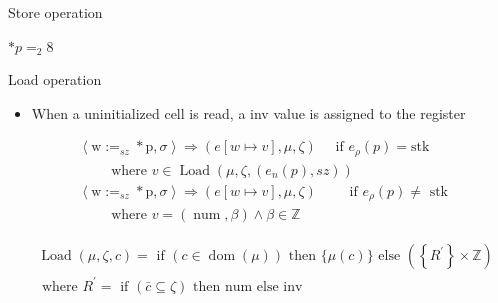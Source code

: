 \documentclass[aspectratio=169]{beamer}
\begin{document}
\begin{frame}{Store operation}
\begin{minipage}{0.12\textwidth}$*p=_2 8$
\end{minipage}%
\begin{minipage}{0.2\textwidth}
\end{minipage}

\end{frame}

\begin{frame}{Load operation}
\begin{itemize}
    \item When a uninitialized cell is read, a inv value is assigned to the register
\end{itemize}
\begin{align*}
& \left\langle\mathrm{w}:=_{s z} * \mathrm{p}, \sigma\right\rangle \Rightarrow(e[w \mapsto v], \mu, \zeta) \quad \text{ if } e_\rho(p)=\text{stk} \\
& \qquad \text { where } v \in \operatorname{Load}\left(\mu, \zeta,\left(e_n(p), s z\right)\right) \\
& \left\langle\mathrm{w}:=_{s z} * \mathrm{p}, \sigma\right\rangle \Rightarrow(e[w \mapsto v], \mu, \zeta) \quad \quad \text{ if } e_\rho(p) \neq \text{ stk } \\
& \qquad \text { where } v=(\operatorname{num}, \beta) \wedge \beta \in \mathbb{Z}
\end{align*}

$$
\begin{aligned}
& \operatorname{Load}(\mu, \zeta, c)=\text { if }(c \in \operatorname{dom}(\mu)) \text { then }\{\mu(c)\} \text { else }\left(\left\{R^{\prime}\right\} \times \mathbb{Z}\right) \\
& \text { where } R^{\prime}=\text { if }(\bar{c} \subseteq \zeta) \text { then num else inv }
\end{aligned}
$$
\end{frame}
\end{document}

